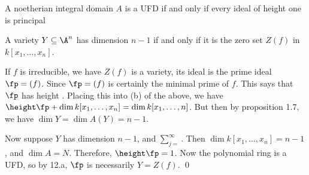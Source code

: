 








\begin{prop}
A noetherian integral domain $A$ is a UFD if and only if every ideal of height one is principal
\end{prop}


\begin{prop}
A variety $Y \subseteq \A^n$ has dimension $n-1$ if and only if it is the zero set $Z(f)$ in $k[x_1,\ldots,x_n]$. 
\end{prop}

\pf If $f$ is irreducible, we have $Z(f)$ is a variety, its ideal is the prime ideal $\fp= (f)$. Since $\fp= (f)$ is certainly the minimal prime of $f$. This says that $\fp$ has height . Placing this into (b) of the above, we have $\height \fp + \dim k[x_1,\ldots,x_n]= \dim k[x_1,\ldots,n]$. But then by proposition 1.7, we have $\dim Y= \dim A(Y)= n-1$. 

Now suppose $Y$ has dimension $n-1$, and $\sum_{j=}^\infty$. Then $\dim k[x_1,\ldots,x_n]= n-1$, and $\dim A= N$. Therefore, $\height \fp= 1$. Now the polynomial ring is a UFD, so by 12.a, $\fp$ is necessarily $Y= Z(f)$. \qed \\







